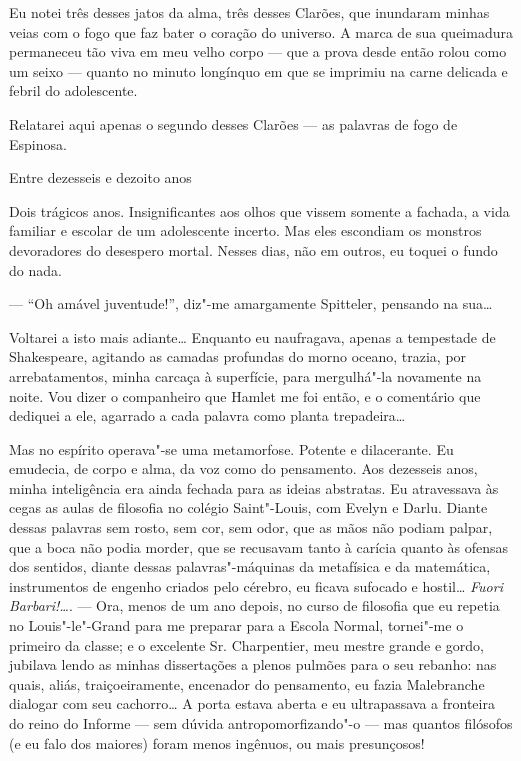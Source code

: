 Eu notei três desses jatos da alma, três desses Clarões, que inundaram
minhas veias com o fogo que faz bater o coração do universo. A marca de
sua queimadura permaneceu tão viva em meu velho corpo --- que a prova
desde então rolou como um seixo --- quanto no minuto longínquo em que se
imprimiu na carne delicada e febril do adolescente.

Relatarei aqui apenas o segundo desses Clarões --- as palavras de fogo de
Espinosa.

Entre dezesseis e dezoito anos

Dois trágicos anos. Insignificantes aos olhos que vissem somente a
fachada, a vida familiar e escolar de um adolescente incerto. Mas eles
escondiam os monstros devoradores do desespero mortal. Nesses dias, não
em outros, eu toquei o fundo do nada.

--- ``Oh amável juventude!'', diz"-me amargamente Spitteler, pensando na sua\ldots{}

Voltarei a isto mais adiante\ldots{} Enquanto eu naufragava, apenas a
tempestade de Shakespeare, agitando as camadas profundas do morno
oceano, trazia, por arrebatamentos, minha carcaça à superfície, para
mergulhá"-la novamente na noite. Vou dizer o companheiro que Hamlet me
foi então, e o comentário que dediquei a ele, agarrado a cada palavra
como planta trepadeira\ldots{}

Mas no espírito operava"-se uma metamorfose. Potente e dilacerante. Eu
emudecia, de corpo e alma, da voz como do pensamento. Aos dezesseis
anos, minha inteligência era ainda fechada para as ideias abstratas. Eu
atravessava às cegas as aulas de filosofia no colégio Saint"-Louis, com
Evelyn e Darlu. Diante dessas palavras sem rosto, sem cor, sem odor, que
as mãos não podiam palpar, que a boca não podia morder, que se recusavam
tanto à carícia quanto às ofensas dos sentidos, diante dessas
palavras"-máquinas da metafísica e da matemática, instrumentos de engenho
criados pelo cérebro, eu ficava sufocado e hostil\ldots{} \emph{Fuori
Barbari!\ldots{}}. --- Ora, menos de um ano depois, no curso de filosofia que
eu repetia no Louis"-le"-Grand para me preparar para a Escola Normal,
tornei"-me o primeiro da classe; e o excelente Sr. Charpentier, meu
mestre grande e gordo, jubilava lendo as minhas dissertações a plenos
pulmões para o seu rebanho: nas quais, aliás, traiçoeiramente, encenador
do pensamento, eu fazia Malebranche dialogar com seu cachorro\ldots{} A porta
estava aberta e eu ultrapassava a fronteira do reino do Informe --- sem
dúvida antropomorfizando"-o --- mas quantos filósofos (e eu falo dos
maiores) foram menos ingênuos, ou mais presunçosos!


